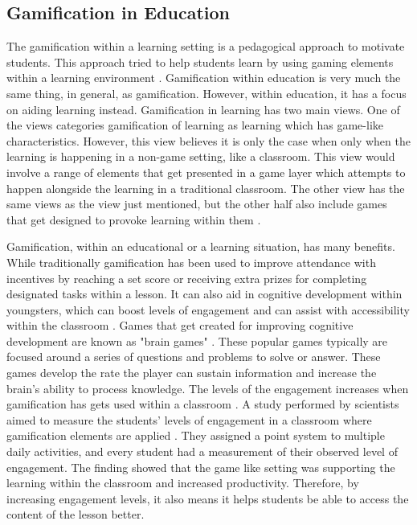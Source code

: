 	
	
	\subsection{Gamification in Education}
	The gamification within a learning setting is a pedagogical approach to motivate students. This approach tried to help students learn by using gaming elements within a learning environment \cite{22}. Gamification within education is very much the same thing, in general, as gamification. However, within education, it has a focus on aiding learning instead. Gamification in learning has two main views. One of the views categories gamification of learning as learning which has game-like characteristics. However, this view believes it is only the case when only when the learning is happening in a non-game setting, like a classroom. This view would involve a range of elements that get presented in a  game layer which attempts to happen alongside the learning in a traditional classroom. The other view has the same views as the view just mentioned, but the other half also include games that get designed to provoke learning within them \cite{22}. 
	
	Gamification, within an educational or a learning situation, has many benefits. While traditionally gamification has been used to improve attendance with incentives by reaching a set score or receiving extra prizes for completing designated tasks within a lesson. It can also aid in cognitive development within youngsters, which can boost levels of engagement and can assist with accessibility within the classroom \cite{24}. Games that get created for improving cognitive development are known as "brain games" \cite{24}. These popular games typically are focused around a series of questions and problems to solve or answer. These games develop the rate the player can sustain information and increase the brain's ability to process knowledge. The levels of the engagement increases when gamification has gets used within a classroom \cite{25}. A study performed by scientists aimed to measure the students' levels of engagement in a classroom where gamification elements are applied \cite{25}. They assigned a point system to multiple daily activities, and every student had a measurement of their observed level of engagement. The finding showed that the game like setting was supporting the learning within the classroom and increased productivity. Therefore, by increasing engagement levels, it also means it helps students be able to access the content of the lesson better. 
	
